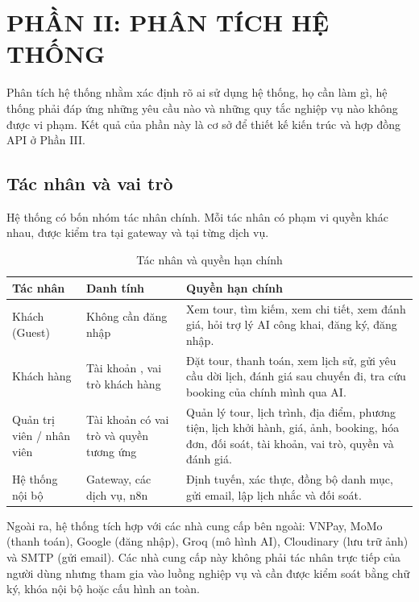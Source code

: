 \chapter{PHẦN II: PHÂN TÍCH HỆ THỐNG}
\label{chap:phan-tich}

Phân tích hệ thống nhằm xác định rõ ai sử dụng hệ thống, họ cần làm gì, hệ thống phải đáp ứng những yêu cầu nào và những quy tắc nghiệp vụ nào không được vi phạm. Kết quả của phần này là cơ sở để thiết kế kiến trúc và hợp đồng API ở Phần III.

\section{Tác nhân và vai trò}
\label{sec:tac-nhan}

Hệ thống có bốn nhóm tác nhân chính. Mỗi tác nhân có phạm vi quyền khác nhau, được kiểm tra tại gateway và tại từng dịch vụ.

\begin{table}[H]
\centering
\caption{Tác nhân và quyền hạn chính}
\label{tab:tac-nhan}
\small
\begin{tabularx}{\textwidth}{@{}L{3.0cm}L{3.0cm}Y@{}}
\toprule
\textbf{Tác nhân} & \textbf{Danh tính} & \textbf{Quyền hạn chính}\\
\midrule
Khách (Guest) & Không cần đăng nhập & Xem tour, tìm kiếm, xem chi tiết, xem đánh giá, hỏi trợ lý AI công khai, đăng ký, đăng nhập.\\
Khách hàng & Tài khoản , vai trò khách hàng & Đặt tour, thanh toán, xem lịch sử, gửi yêu cầu dời lịch, đánh giá sau chuyến đi, tra cứu booking của chính mình qua AI.\\
Quản trị viên / nhân viên & Tài khoản có vai trò và quyền tương ứng & Quản lý tour, lịch trình, địa điểm, phương tiện, lịch khởi hành, giá, ảnh, booking, hóa đơn, đối soát, tài khoản, vai trò, quyền và đánh giá.\\
Hệ thống nội bộ & Gateway, các dịch vụ, n8n & Định tuyến, xác thực, đồng bộ danh mục, gửi email, lập lịch nhắc và đối soát.\\
\bottomrule
\end{tabularx}
\end{table}

Ngoài ra, hệ thống tích hợp với các nhà cung cấp bên ngoài: VNPay, MoMo (thanh toán), Google (đăng nhập), Groq (mô hình AI), Cloudinary (lưu trữ ảnh) và SMTP (gửi email). Các nhà cung cấp này không phải tác nhân trực tiếp của người dùng nhưng tham gia vào luồng nghiệp vụ và cần được kiểm soát bằng chữ ký, khóa nội bộ hoặc cấu hình an toàn.

